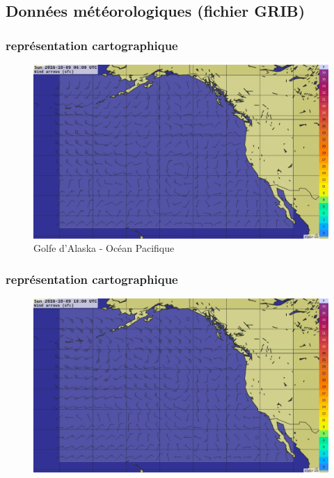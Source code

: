 \documentclass{beamer}
\begin{document}
\subsection{Données météorologiques (fichier GRIB)}

\begin{frame}\frametitle{représentation cartographique} 
\begin{figure}
\includegraphics[scale=0.4]{grille1.jpg} 
\caption{Golfe d'Alaska - Océan Pacifique}
\end{figure}
\end{frame}

\begin{frame}\frametitle{représentation cartographique} 
\begin{figure}
\includegraphics[scale=0.4]{grille2.jpg} 
\end{figure}
\end{frame}
\end{document}
